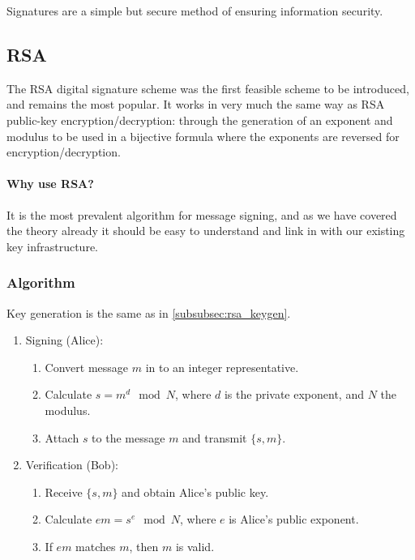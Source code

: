   Signatures are a simple but secure method of ensuring information security.
  
  \subsection{RSA}
  
  The RSA digital signature scheme was the first feasible scheme to be introduced, and remains the most popular. It works in very much the same way as RSA public-key encryption/decryption: through the generation of an exponent and modulus to be used in a bijective formula where the exponents are reversed for encryption/decryption.
  
  \paragraph{Why use RSA?} It is the most prevalent algorithm for message signing, and as we have covered the theory already it should be easy to understand and link in with our existing key infrastructure.
  
  \subsubsection{Algorithm}
  
  Key generation is the same as in \textsection\ref{subsubsec:rsa_keygen}.
  
  \begin{enumerate}
    \item Signing (Alice):
    \begin{enumerate}
      \item Convert message $m$ in to an integer representative.
      \item Calculate $s = m^d \mod N$, where $d$ is the private exponent, and $N$ the modulus.
      \item Attach $s$ to the message $m$ and transmit $\{s,m\}$.
    \end{enumerate}
    \item Verification (Bob):
    \begin{enumerate}
      \item Receive $\{s,m\}$ and obtain Alice's public key.
      \item Calculate $em = s^e \mod N$, where $e$ is Alice's public exponent.
      \item If $em$ matches $m$, then $m$ is valid.
    \end{enumerate}
  \end{enumerate}
  
